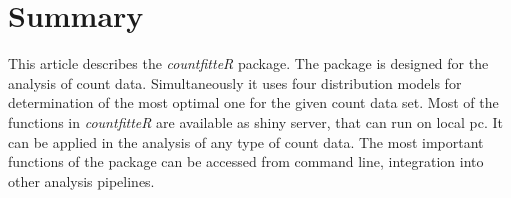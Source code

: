 


\section{Summary}

This article describes the \emph{countfitteR} package. The package is designed for the analysis of count data. Simultaneously it uses four distribution models for determination of the most optimal one for the given count data set. 
Most of the functions in \emph{countfitteR} are available as shiny server, that can run on local pc. It can be applied in the analysis of any type of count data. The most important functions of the package can be accessed from command line, integration into other analysis pipelines.



\address{Jaros\l{}aw Chilmoniuk\\
  University of Wroc\l{}aw\\
  Pl. Uniwersytecki 1, Wroc\l{}aw\\
  Poland\\
  ORCiD: 0000-0001-5467-018X\\
  }

\address{Madeleine Ruhe\\
  Brandenburg University of Technology Cottbus - Senftenberg\\
  Universit\"atsplatz 1, Senftenberg\\
  Germany\\
  ORCiD if desired\\
  }

\address{Stefan R\"{o}diger (corresponding author)\\
  Brandenburg University of Technology Cottbus - Senftenberg\\
  Universit\"atsplatz 1, Senftenberg\\
  Germany\\
  ORCiD: 0000-0002-1441-6512\\
  }

\address{Micha\l{} Burdukiewicz (corresponding author)\\
  University of Wroc\l{}aw\\
  Pl. Uniwersytecki 1, Wroc\l{}aw\\
  Poland\\
  ORCiD: 0000-0001-8926-582X\\
  }
